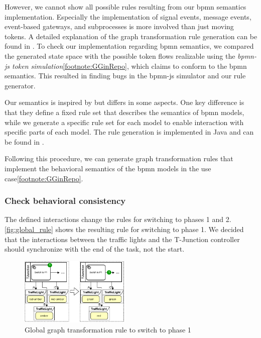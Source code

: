 \documentclass{jot}
\begin{document}
However, we cannot show all possible rules resulting from our \gls*{bpmn} semantics implementation.
Especially the implementation of signal events, message events, event-based gateways, and subprocesses is more involved than just moving tokens.
A detailed explanation of the graph transformation rule generation can be found in \cite{krauterFormalizationAnalysisBPMN2022}.
To check our implementation regarding \gls*{bpmn} semantics, we compared the generated state space with the possible token flows realizable using the \emph{bpmn-js token simulation}\cref{footnote:GGinRepo}, which claims to conform to the \gls*{bpmn} semantics.
This resulted in finding bugs in the bpmn-js simulator and our rule generator.

Our semantics is inspired by \cite{vangorpVisualTokenbasedFormalization2013} but differs in some aspects.
One key difference is that they define a fixed rule set that describes the semantics of \gls*{bpmn} models, while we generate a specific rule set for each model to enable interaction with specific parts of each model.
The rule generation is implemented in Java and can be found in \cite{krauterRewriteRuleGeneration2022}.

Following this procedure, we can generate graph transformation rules that implement the behavioral semantics of the \gls*{bpmn} models in the use case\cref{footnote:GGinRepo}.

\subsubsection{Check behavioral consistency}
The defined interactions change the rules for switching to phases 1 and 2.
\autoref{fig:global_rule} shows the resulting rule for switching to phase 1.
We decided that the interactions between the traffic lights and the T-Junction controller should synchronize with the end of the task, not the start.

\begin{figure}[h]
    \centering
    \includegraphics[width=0.475\textwidth]{figures/global_rule.pdf}
    \caption{Global graph transformation rule to switch to phase 1}
    \label{fig:global_rule}
\end{figure}
\end{document}
